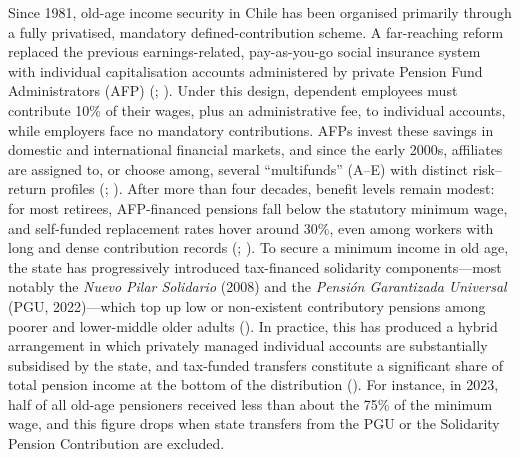 \documentclass[
  12pt,
]{article}
\begin{document}
Since 1981, old-age income security in Chile has been organised
primarily through a fully privatised, mandatory defined-contribution
scheme. A far-reaching reform replaced the previous earnings-related,
pay-as-you-go social insurance system with individual capitalisation
accounts administered by private Pension Fund Administrators (AFP)
(;
). Under this design,
dependent employees must contribute 10\% of their wages, plus an
administrative fee, to individual accounts, while employers face no
mandatory contributions. AFPs invest these savings in domestic and
international financial markets, and since the early 2000s, affiliates
are assigned to, or choose among, several ``multifunds'' (A--E) with
distinct risk--return profiles (;
).
After more than four decades, benefit levels remain modest: for most
retirees, AFP-financed pensions fall below the statutory minimum wage,
and self-funded replacement rates hover around 30\%, even among workers
with long and dense contribution records
(;
). To
secure a minimum income in old age, the state has progressively
introduced tax-financed solidarity components---most notably the
\emph{Nuevo Pilar Solidario} (2008) and the \emph{Pensión Garantizada
Universal} (PGU, 2022)---which top up low or non-existent contributory
pensions among poorer and lower-middle older adults
(). In practice, this has
produced a hybrid arrangement in which privately managed individual
accounts are substantially subsidised by the state, and tax-funded
transfers constitute a significant share of total pension income at the
bottom of the distribution (). For instance, in 2023, half of all old-age pensioners
received less than about the 75\% of the minimum wage, and this figure
drops when state transfers from the PGU or the Solidarity Pension
Contribution are excluded.
\end{document}
